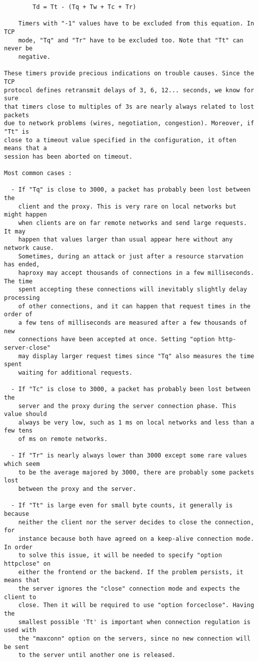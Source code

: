 \begin{verbatim}
        Td = Tt - (Tq + Tw + Tc + Tr)

    Timers with "-1" values have to be excluded from this equation. In TCP
    mode, "Tq" and "Tr" have to be excluded too. Note that "Tt" can never be
    negative.

These timers provide precious indications on trouble causes. Since the TCP
protocol defines retransmit delays of 3, 6, 12... seconds, we know for sure
that timers close to multiples of 3s are nearly always related to lost packets
due to network problems (wires, negotiation, congestion). Moreover, if "Tt" is
close to a timeout value specified in the configuration, it often means that a
session has been aborted on timeout.

Most common cases :

  - If "Tq" is close to 3000, a packet has probably been lost between the
    client and the proxy. This is very rare on local networks but might happen
    when clients are on far remote networks and send large requests. It may
    happen that values larger than usual appear here without any network cause.
    Sometimes, during an attack or just after a resource starvation has ended,
    haproxy may accept thousands of connections in a few milliseconds. The time
    spent accepting these connections will inevitably slightly delay processing
    of other connections, and it can happen that request times in the order of
    a few tens of milliseconds are measured after a few thousands of new
    connections have been accepted at once. Setting "option http-server-close"
    may display larger request times since "Tq" also measures the time spent
    waiting for additional requests.

  - If "Tc" is close to 3000, a packet has probably been lost between the
    server and the proxy during the server connection phase. This value should
    always be very low, such as 1 ms on local networks and less than a few tens
    of ms on remote networks.

  - If "Tr" is nearly always lower than 3000 except some rare values which seem
    to be the average majored by 3000, there are probably some packets lost
    between the proxy and the server.

  - If "Tt" is large even for small byte counts, it generally is because
    neither the client nor the server decides to close the connection, for
    instance because both have agreed on a keep-alive connection mode. In order
    to solve this issue, it will be needed to specify "option httpclose" on
    either the frontend or the backend. If the problem persists, it means that
    the server ignores the "close" connection mode and expects the client to
    close. Then it will be required to use "option forceclose". Having the
    smallest possible 'Tt' is important when connection regulation is used with
    the "maxconn" option on the servers, since no new connection will be sent
    to the server until another one is released.


\end{verbatim}
